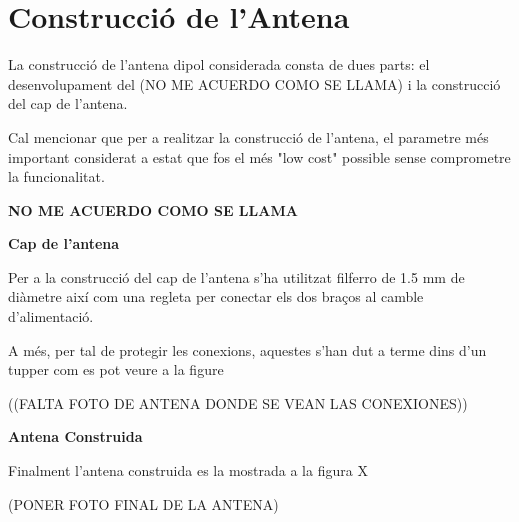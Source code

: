 \section{Construcció de l'Antena}

La construcció de l'antena dipol considerada consta de dues parts: el desenvolupament del (NO ME ACUERDO COMO SE LLAMA) i la construcció del cap de l'antena.

Cal mencionar que per a realitzar la construcció de l'antena, el parametre més important considerat a estat que fos el més "low cost" possible sense comprometre la funcionalitat.

\textbf{NO ME ACUERDO COMO SE LLAMA}

\textbf{Cap de l'antena}

Per a la construcció del cap de l'antena s'ha utilitzat filferro de 1.5 mm de diàmetre així com una regleta per conectar els dos braços al camble d'alimentació.

A més, per tal de protegir les conexions, aquestes s'han dut a terme dins d'un tupper com es pot veure a la figure %

((FALTA FOTO DE ANTENA DONDE SE VEAN LAS CONEXIONES))


\textbf{Antena Construida}

Finalment l'antena construida es la mostrada a la figura X %

(PONER FOTO FINAL DE LA ANTENA)